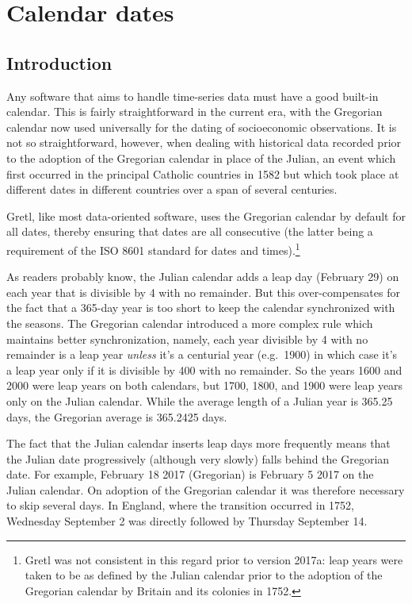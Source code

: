 \chapter{Calendar dates}
\label{chap:calendar}

\section{Introduction}
\label{sec:cal-intro}

Any software that aims to handle time-series data must have a good
built-in calendar. This is fairly straightforward in the current era,
with the Gregorian calendar now used universally for the dating of
socioeconomic observations. It is not so straightforward, however,
when dealing with historical data recorded prior to the adoption of
the Gregorian calendar in place of the Julian, an event which first
occurred in the principal Catholic countries in 1582 but which took
place at different dates in different countries over a span of several
centuries.

Gretl, like most data-oriented software, uses the Gregorian calendar
by default for all dates, thereby ensuring that dates are all
consecutive (the latter being a requirement of the ISO 8601 standard
for dates and times).\footnote{Gretl was not consistent in this regard
  prior to version 2017a: leap years were taken to be as defined by
  the Julian calendar prior to the adoption of the Gregorian calendar
  by Britain and its colonies in 1752.}

As readers probably know, the Julian calendar adds a leap day
(February 29) on each year that is divisible by 4 with no
remainder. But this over-compensates for the fact that a 365-day year
is too short to keep the calendar synchronized with the seasons. The
Gregorian calendar introduced a more complex rule which maintains
better synchronization, namely, each year divisible by 4 with no
remainder is a leap year \textit{unless} it's a centurial year (e.g.\
1900) in which case it's a leap year only if it is divisible by 400
with no remainder.  So the years 1600 and 2000 were leap years on both
calendars, but 1700, 1800, and 1900 were leap years only on the Julian
calendar. While the average length of a Julian year is 365.25 days,
the Gregorian average is 365.2425 days. 

The fact that the Julian calendar inserts leap days more frequently
means that the Julian date progressively (although very slowly) falls
behind the Gregorian date. For example, February 18 2017 (Gregorian)
is February 5 2017 on the Julian calendar. On adoption of the
Gregorian calendar it was therefore necessary to skip several days. In
England, where the transition occurred in 1752, Wednesday September 2
was directly followed by Thursday September 14.

